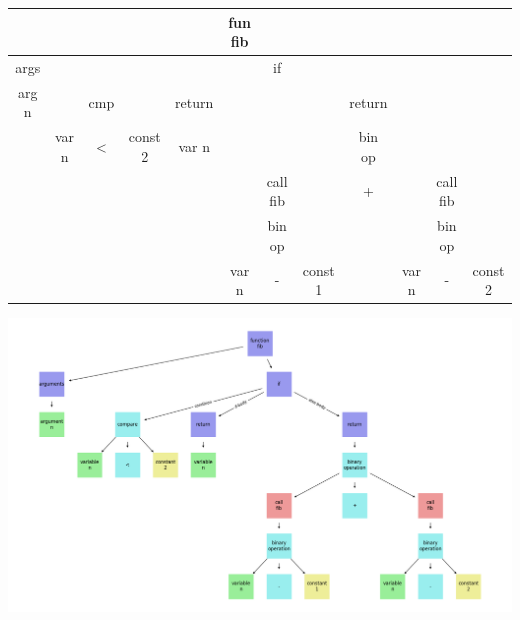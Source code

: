 \documentclass[12pt]{article}
\begin{document}
\begin{tabular}{|c|c|c|c|c|c|c|c|c|c|c|c|}
\hline
 &  &  &  &  & fun fib &  &  &  &  &  & \\
\hline
args &  &  &  &  &  & if &  &  &  &  & \\
\hline
arg n &  & cmp &  & return &  &  &  & return &  &  & \\
\hline
 & var n & < & const 2 & var n &  &  &  & bin op &  &  & \\
\hline
 &  &  &  &  &  & call fib &  & + &  & call fib & \\
\hline
 &  &  &  &  &  & bin op &  &  &  & bin op & \\
\hline
 &  &  &  &  & var n & - & const 1 &  & var n & - & const 2\\
\hline
\end{tabular}

\includegraphics[width=1\textwidth]{ast.png}
\end{document}
